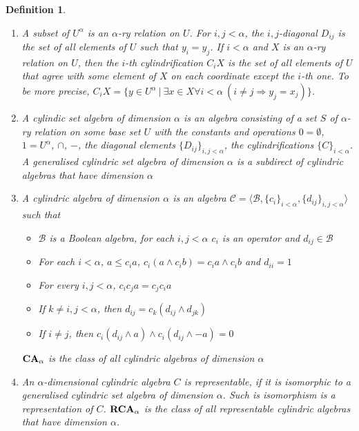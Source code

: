 \documentclass[a4paper]{article}
\theoremstyle{defin}
\newtheorem{defin}{Definition}
\theoremstyle{theorem}
\theoremstyle{prop}
\theoremstyle{lemma}
\theoremstyle{ex}
\theoremstyle{col}
\begin{document}
\begin{defin}
$ $

  \begin{enumerate}
    \item A subset of $U^{\alpha}$ is an $\alpha$-ry relation on $U$. For $i, j < \alpha$, the $i,j$-diagonal $D_{ij}$ is the set of all
    elements of $U$ such that $y_i = y_j$. If $i < \alpha$ and $X$ is an $\alpha$-ry relation on $U$, then
    the $i$-th cylindrification $C_i X$ is the set of all elements of $U$ that agree with some element of $X$ on each coordinate except the
    $i$-th one. To be more precise,
    $C_i X = \{ y \in U^{\alpha} \: | \: \exists x \in X \forall i < \alpha \: (i \neq j \Rightarrow y_j = x_j)\}$.
    \item A cylindic set algebra of dimension $\alpha$ is an algebra consisting of a set $S$ of $\alpha$-ry relation on some base set $U$
    with the constants and operations $0 = \emptyset$, $1 = U^{\alpha}$, $\cap$, $-$, the diagonal elements $\{ D_{ij} \}_{i, j < \alpha}$,
    the cylindrifications $\{ C \}_{i < \alpha}$. A generalised cylindric set algebra of dimension $\alpha$ is a subdirect of
    cylindric algebras that have dimension $\alpha$
    \item A cylindric algebra of dimension $\alpha$ is an algebra $\mathcal{C} = \langle \mathcal{B}, \{ c_i \}_{i < \alpha}, \{ d_{ij} \}_{i, j < \alpha} \rangle$ such that
    \begin{itemize}
      \item $\mathcal{B}$ is a Boolean algebra, for each $i, j < \alpha$ $c_i$ is an operator and $d_{ij} \in \mathcal{B}$
      \item For each $i < \alpha$, $a \leq c_i a$, $c_i (a \land c_i b) = c_i a \land c_i b$ and $d_{ii} = 1$
      \item For every $i, j < \alpha$, $c_i c_j a = c_j c_i a$
      \item If $k \neq i, j < \alpha$, then $d_{ij} = c_k (d_{ij} \land d_{jk})$
      \item If $i \neq j$, then $c_i (d_{ij} \land a) \land c_i (d_{ij} \land - a) = 0$
    \end{itemize}
    ${\bf CA}_{\alpha}$ is the class of all cylindric algebras of dimension $\alpha$
    \item An $\alpha$-dimensional cylindric algebra $C$ is representable, if it is isomorphic to a generalised cylindric set algebra
    of dimension $\alpha$. Such is isomorphism is a representation of $C$.
    ${\bf RCA}_{\alpha}$ is the class of all representable cylindric algebras that have dimension $\alpha$.
  \end{enumerate}
\end{defin}
\end{document}
